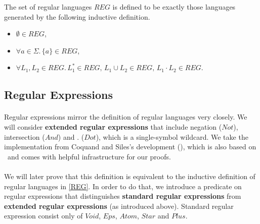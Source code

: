     \begin{definition}{}
        \label{REG}
        The set of regular languages $REG$ is defined to be exactly those languages generated by the following inductive definition.
        \begin{itemize}
            \item
                $\emptyset \in REG$, 
            \item
                $\forall a \in \Sigma. \, \{a\} \in REG$, 
            \item
                $\forall L_1, L_2 \in REG. \, L_1^* \in REG, \, L_1 \cup L_2 \in REG, \, L_1 \cdot L_2 \in REG$.
        \end{itemize}
    \end{definition}


    \subsection{Regular Expressions}

    \paragraph{} 
    Regular expressions mirror the definition of regular languages very closely. 
    We will consider \textbf{extended regular expressions} that include negation ($Not$), intersection ($And$) and $.$ ($Dot$), which is a single-symbol wildcard. 
    We take the implementation from Coquand and Siles's development (\cite{DBLP:conf/cpp/CoquandS11}), which is also based on \ssreflect\ and comes with helpful infrastructure for our proofs.



    \paragraph{}
    We will later prove that this definition is equivalent to the inductive definition of regular languages in \ref{REG}.
    In order to do that, we introduce a predicate on regular expressions that distinguishes \textbf{standard regular expressions} 
    from \textbf{extended regular expressions} (as introduced above).
    Standard regular expression consist only of $Void$, $Eps$, $Atom$, $Star$ and $Plus$.


